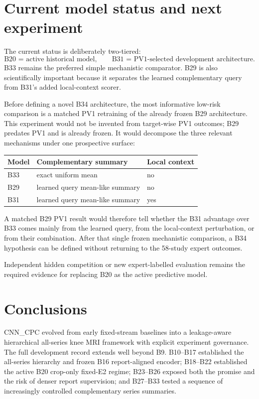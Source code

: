 \documentclass[preprint,12pt]{elsarticle}
\begin{document}
\section{Current model status and next experiment}
\label{sec:next}

The current status is deliberately two-tiered:
\begin{equation}
\boxed{\text{B20 = active historical model}},\qquad
\boxed{\text{B31 = PV1-selected development architecture}}.
\end{equation}
B33 remains the preferred simple mechanistic comparator. B29 is also scientifically important because it separates the learned complementary query from B31's added local-context scorer.

Before defining a novel B34 architecture, the most informative low-risk comparison is a matched PV1 retraining of the already frozen B29 architecture. This experiment would not be invented from target-wise PV1 outcomes; B29 predates PV1 and is already frozen. It would decompose the three relevant mechanisms under one prospective surface:
\begin{center}
\begin{tabular}{lll}
\toprule
Model & Complementary summary & Local context \\
\midrule
B33 & exact uniform mean & no \\
B29 & learned query mean-like summary & no \\
B31 & learned query mean-like summary & yes \\
\bottomrule
\end{tabular}
\end{center}
A matched B29 PV1 result would therefore tell whether the B31 advantage over B33 comes mainly from the learned query, from the local-context perturbation, or from their combination. After that single frozen mechanistic comparison, a B34 hypothesis can be defined without returning to the 58-study expert outcomes.

Independent hidden competition or new expert-labelled evaluation remains the required evidence for replacing B20 as the active predictive model.

\section{Conclusions}
\label{sec:conclusion}

CNN\_CPC evolved from early fixed-stream baselines into a leakage-aware hierarchical all-series knee MRI framework with explicit experiment governance. The full development record extends well beyond B9. B10--B17 established the all-series hierarchy and frozen B16 report-aligned encoder; B18--B22 established the active B20 crop-only fixed-E2 regime; B23--B26 exposed both the promise and the risk of denser report supervision; and B27--B33 tested a sequence of increasingly controlled complementary series summaries.
\end{document}
